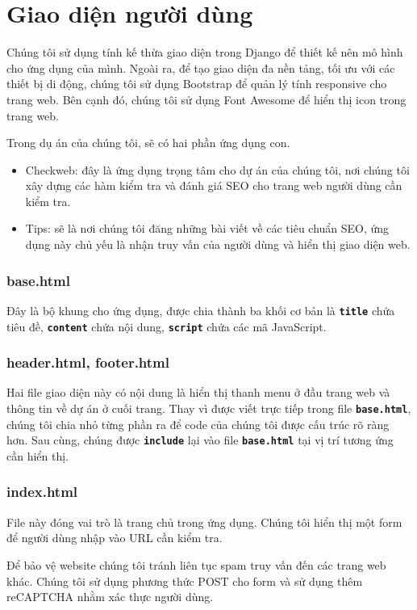 \section{Giao diện người dùng}
Chúng tôi sử dụng tính kế thừa giao diện trong Django để thiết kế nên mô hình cho ứng dụng của mình. Ngoài ra, để tạo giao diện đa nền tảng, tối ưu với các thiết bị di động, chúng tôi sử dụng Bootstrap để quản lý tính responsive cho trang web. Bên cạnh đó, chúng tôi sử dụng Font Awesome để hiển thị icon trong trang web.
\par
Trong dụ án của chúng tôi, sẽ có hai phần ứng dụng con.
\begin{itemize}
	\item Checkweb: đây là ứng dụng trọng tâm cho dự án của chúng tôi, nơi chúng tôi xây dựng các hàm kiểm tra và đánh giá SEO cho trang web người dùng cần kiểm tra.
	\item Tips: sẽ là nơi chúng tôi đăng những bài viết về các tiêu chuẩn SEO, ứng dụng này chủ yếu là nhận truy vấn của người dùng và hiển thị giao diện web.
\end{itemize}
\subsubsection{base.html}
Đây là bộ khung cho ứng dụng, được chia thành ba khối cơ bản là \textbf{\texttt{title}} chứa tiêu đề, \textbf{\texttt{content}} chứa nội dung, \textbf{\texttt{script}} chứa các mã JavaScript.
\subsubsection{header.html, footer.html}
Hai file giao diện này có nội dung là hiển thị thanh menu ở đầu trang web và thông tin về dự án ở cuối trang. Thay vì được viết trực tiếp trong file \textbf{\texttt{base.html}}, chúng tôi chia nhỏ từng phần ra để code của chúng tôi được cấu trúc rõ ràng hơn. Sau cùng, chúng được \textbf{\texttt{include}} lại vào file \textbf{\texttt{base.html}} tại vị trí tương ứng cần hiển thị.
\subsubsection{index.html}
File này đóng vai trò là trang chủ trong ứng dụng. Chúng tôi hiển thị một form để người dùng nhập vào URL cần kiểm tra.
\par
Để bảo vệ website chúng tôi tránh liên tục spam truy vấn đến các trang web khác. Chúng tôi sử dụng phương thức POST cho form và sử dụng thêm reCAPTCHA nhằm xác thực người dùng.
